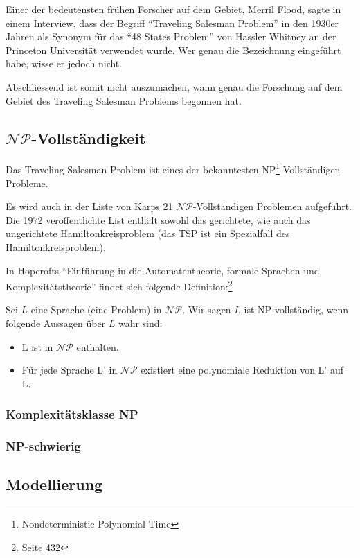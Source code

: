 \documentclass[a4paper]{article}
\begin{document}
\medskip

Einer der bedeutensten frühen Forscher auf dem Gebiet, Merril Flood, sagte in einem Interview, dass der Begriff "`Traveling Salesman Problem"' in den 1930er Jahren als Synonym für das "`48 States Problem"' von Hassler Whitney an der Princeton Universität verwendet wurde. Wer genau die Bezeichnung eingeführt habe, wisse er jedoch nicht.\cite{interview_merrill_flood84}

Abschliessend ist somit nicht auszumachen, wann genau die Forschung auf dem Gebiet des Traveling Salesman Problems begonnen hat.

\subsection{$\mathcal{NP}$-Vollständigkeit}
Das Traveling Salesman Problem ist eines der bekanntesten NP\footnote{Nondeterministic Polynomial-Time}-Vollständigen Probleme. 

Es wird auch in der Liste von Karps 21 $\mathcal{NP}$-Vollständigen Problemen aufgeführt. Die 1972 veröffentlichte List\cite{karp72} enthält sowohl das gerichtete, wie auch das ungerichtete Hamiltonkreisproblem (das TSP ist ein Spezialfall des Hamiltonkreisproblem). 

\medskip

In Hopcrofts "`Einführung in die Automatentheorie, formale Sprachen und Komplexitätstheorie"' findet sich folgende Definition:\footnote{\cite{hopcroft02} Seite 432}

Sei $L$ eine Sprache (eine Problem) in $\mathcal{NP}$. Wir sagen $L$ ist NP-vollständig, wenn folgende Aussagen über $L$ wahr sind:
\begin{itemize}
    \item L ist in $\mathcal{NP}$ enthalten.
    \item Für jede Sprache L' in $\mathcal{NP}$ existiert eine polynomiale Reduktion von L' auf L.
\end{itemize}

\subsubsection{Komplexitätsklasse NP}


\subsubsection{NP-schwierig}

\subsection{Modellierung}
\end{document}
